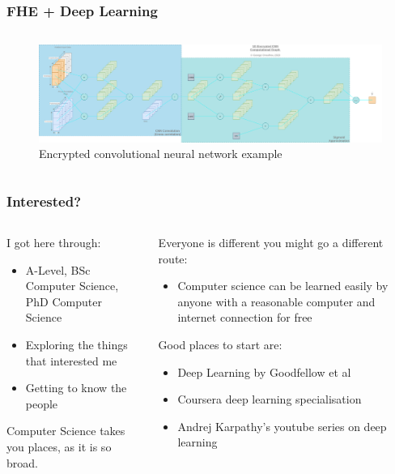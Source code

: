 \documentclass[aspectratio=169]{beamer}
\begin{document}
  \begin{frame}
    \frametitle{FHE + Deep Learning}
    \begin{columns}
      \begin{column}{1\textwidth}
        \begin{figure}[th!]
          \centering
          \includegraphics[width=1\textwidth]{encrypted_cnn.png}
          \caption{Encrypted convolutional neural network example}
          \label{fig:cnn}
        \end{figure}
      \end{column}
    \end{columns}
  \end{frame}

  \begin{frame}
    \frametitle{Interested?}
    \begin{columns}
      \begin{column}{0.5\textwidth}
        I got here through:
        \begin{itemize}
          \item A-Level, BSc Computer Science, PhD Computer Science
          \item Exploring the things that interested me
          \item Getting to know the people
        \end{itemize}
        Computer Science takes you places, as it is so broad.
      \end{column}
      \begin{column}{0.5\textwidth}
        Everyone is different you might go a different route:
        \begin{itemize}
          \item Computer science can be learned easily by anyone with a reasonable computer and internet connection for free
        \end{itemize}
        Good places to start are:
        \begin{itemize}
            \item Deep Learning by Goodfellow et al \autocite{Goodfellow-et-al-2016}
            \item Coursera deep learning specialisation
            \item Andrej Karpathy's youtube series on deep learning
        \end{itemize}
      \end{column}
    \end{columns}
  \end{frame}
\end{document}
